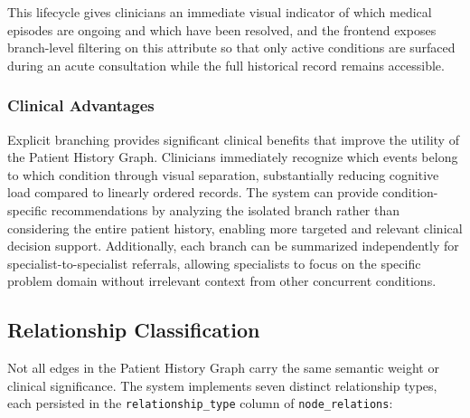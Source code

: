 This lifecycle gives clinicians an immediate visual indicator of which medical
episodes are ongoing and which have been resolved, and the frontend exposes
branch-level filtering on this attribute so that only active conditions are
surfaced during an acute consultation while the full historical record remains
accessible.

\subsubsection{Clinical Advantages}
Explicit branching provides significant clinical benefits that improve the
utility of the Patient History Graph. Clinicians immediately recognize which
events belong to which condition through visual separation, substantially
reducing cognitive load compared to linearly ordered records. The system can
provide condition-specific recommendations by analyzing the isolated branch
rather than considering the entire patient history, enabling more targeted and
relevant clinical decision support. Additionally, each branch can be summarized
independently for specialist-to-specialist referrals, allowing specialists to
focus on the specific problem domain without irrelevant context from other
concurrent conditions.

\subsection{Relationship Classification}
\label{subsec:relationship_types}

Not all edges in the Patient History Graph carry the same semantic weight or
clinical significance. The system implements seven distinct relationship types,
each persisted in the \texttt{relationship\_type} column of
\texttt{node\_relations}:

